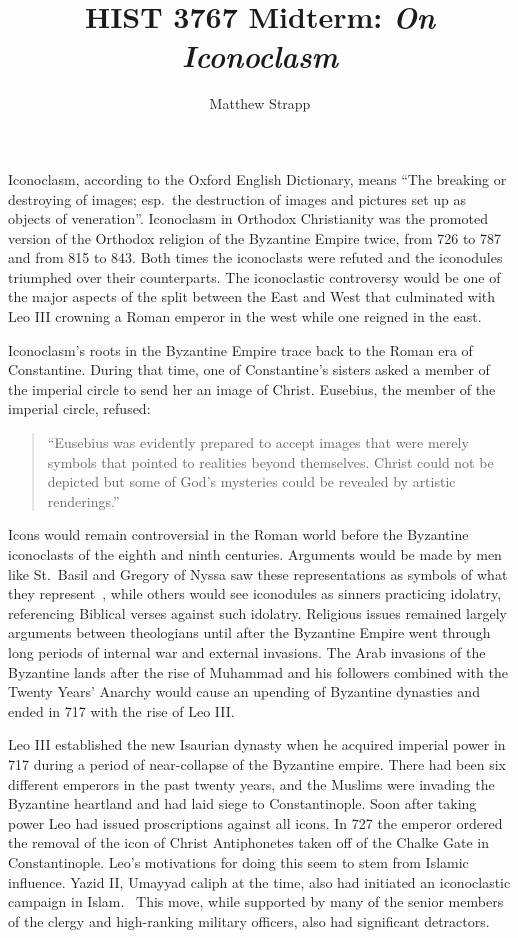 \documentclass[12pt]{article}
\title{HIST 3767 Midterm: \emph{On Iconoclasm}}
\author{Matthew Strapp}
\begin{document}
\begin{singlespace}
    \maketitle
\end{singlespace}
    Iconoclasm, according to the Oxford English Dictionary, means ``The breaking or destroying of images; esp.\ the destruction of images and pictures set up as objects of veneration''\cite{oed:iconoclasm}. Iconoclasm in Orthodox Christianity was the promoted version of the Orthodox religion of the Byzantine Empire twice, from 726 to 787 and from 815 to 843. Both times the iconoclasts were refuted and the iconodules triumphed over their counterparts. The iconoclastic controversy would be one of the major aspects of the split between the East and West that culminated with Leo III crowning a Roman emperor in the west while one reigned in the east.\

    Iconoclasm's roots in the Byzantine Empire trace back to the Roman era of Constantine. During that time, one of Constantine's sisters asked a member of the imperial circle to send her an image of Christ. Eusebius, the member of the imperial circle, refused: \begin{quote}
        ``Eusebius was evidently prepared to accept images that were merely symbols that pointed to realities beyond themselves. Christ could not be depicted but some of God's mysteries could be revealed by artistic renderings.''~\cite[p. 13]{Noble1}
    \end{quote}\noindent
    Icons would remain controversial in the Roman world before the Byzantine iconoclasts of the eighth and ninth centuries. Arguments would be made by men like St.\ Basil and Gregory of Nyssa saw these representations as symbols of what they represent~\cite[pp. 16-17]{Noble1}, while others would see iconodules as sinners practicing idolatry, referencing Biblical verses against such idolatry. Religious issues remained largely arguments between theologians until after the Byzantine Empire went through long periods of internal war and external invasions. The Arab invasions of the Byzantine lands after the rise of Muhammad and his followers combined with the Twenty Years' Anarchy would cause an upending of Byzantine dynasties and ended in 717 with the rise of Leo III.\@ \
    
    Leo III established the new Isaurian dynasty when he acquired imperial power in 717 during a period of near-collapse of the Byzantine empire. There had been six different emperors in the past twenty years, and the Muslims were invading the Byzantine heartland and had laid siege to Constantinople. Soon after taking power Leo had issued proscriptions against all icons. In 727 the emperor ordered the removal of the icon of Christ Antiphonetes taken off of the Chalke Gate in Constantinople. Leo's motivations for doing this seem to stem from Islamic influence. Yazid II, Umayyad caliph at the time, also had initiated an iconoclastic campaign in Islam.~\cite[p. 51]{ByzNotes} This move, while supported by many of the senior members of the clergy and high-ranking military officers, also had significant detractors. \
\end{document}

